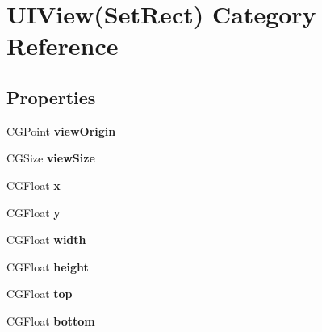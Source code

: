 \hypertarget{category_u_i_view_07_set_rect_08}{}\section{U\+I\+View(Set\+Rect) Category Reference}
\label{category_u_i_view_07_set_rect_08}
\subsection*{Properties}
\begin{DoxyCompactItemize}
\item 
\mbox{\label{category_u_i_view_07_set_rect_08_ac4a20cda70eeac074eb1dbb67137396c}} 
C\+G\+Point {\bfseries view\+Origin}
\item 
\mbox{\label{category_u_i_view_07_set_rect_08_a570559c0b5cbb70d4652e8c80b74c309}} 
C\+G\+Size {\bfseries view\+Size}
\item 
\mbox{\label{category_u_i_view_07_set_rect_08_a61905ef4ac40874f9dcf0607b60c1096}} 
C\+G\+Float {\bfseries x}
\item 
\mbox{\label{category_u_i_view_07_set_rect_08_a07fb47e905bce8feda18327fa7c109ac}} 
C\+G\+Float {\bfseries y}
\item 
\mbox{\label{category_u_i_view_07_set_rect_08_a8def5b49560bf10ebcc31c375f4e6da1}} 
C\+G\+Float {\bfseries width}
\item 
\mbox{\label{category_u_i_view_07_set_rect_08_a0d3e8a1ec0fcc279f52edf349eafa65b}} 
C\+G\+Float {\bfseries height}
\item 
\mbox{\label{category_u_i_view_07_set_rect_08_aa2dd2b25734cefd4c5b830030ef32e73}} 
C\+G\+Float {\bfseries top}
\item 
\mbox{\label{category_u_i_view_07_set_rect_08_aa41b4608e0456ec724b0825f4ce626ee}} 
C\+G\+Float {\bfseries bottom}
\item 
\mbox{\label{category_u_i_view_07_set_rect_08_abf90af41ddcaf404b54bffc27bb0eb69}} 

\end{DoxyCompactItemize}
